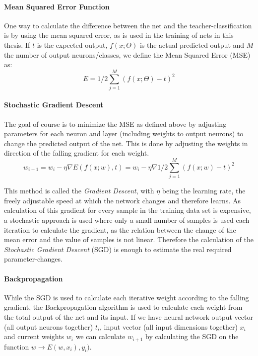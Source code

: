 \paragraph{Mean Squared Error Function}

One way to calculate the difference between the net and the teacher-classification is by using the mean squared error, as is used in the training of nets in this thesis. If \(t\) is the expected output, \(f(x;\Theta)\) is the actual predicted output and \(M\) the number of output neurons/classes, we define the Mean Squared Error (MSE) as:
\begin{equation}
E = 1 / 2 \sum_{j=1}^{M}(f(x;\Theta) - t)^2
\end{equation}

\paragraph{Stochastic Gradient Descent} The goal of course is to minimize the MSE as defined above by adjusting parameters for each neuron and layer (including weights to output neurons) to change the predicted output of the net.  This is done by adjusting the weights in direction of the falling gradient for each weight.
\begin{equation}
w_{i+1} = w_i - \eta \nabla E(f(x;w), t) = w_i - \eta \nabla 1/2\sum_{j=1}^M(f(x;w) - t)^2
\end {equation}

This method is called the \textit{Gradient Descent}, with \(\eta\) being the learning rate, the freely adjustable speed at which the network changes and therefore learns. As calculation of this gradient for every sample in the training data set is expensive, a stochastic approach is used where only a small number of samples is used each iteration to calculate the gradient, as the relation between the change of the mean error and the value of samples is not linear. Therefore the calculation of the \textit{Stochastic Gradient Descent} (SGD) is enough to estimate the real required parameter-changes.

\paragraph{Backpropagation} While the SGD is used to calculate each iterative weight according to the falling gradient, the Backpropagation algorithm is used to calculate each weight from the total output of the net and its input. If we have neural network output vector (all output neurons together) \(t_i\), input vector (all input dimensions together) \(x_i\) and current weights \(w_i\) we can calculate \(w_{i+1}\) by calculating the SGD on the function \(w \rightarrow E(w, x_i), y_i)\).

